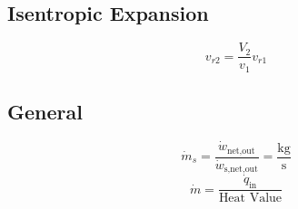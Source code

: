 \documentclass[10pt,landscape]{article}
\begin{document}
\begin{multicols}{3}
\subsection{Isentropic Expansion}
\begin{equation}
    v_{r2}=\frac{V_2}{v_1}v_{r1}
\end{equation}
\subsection{General}
\begin{equation}
    \dot{m}_s=\frac{\dot{w}_{\text{net,out}}}{\dot{w}_{\text{s,net,out}}}=\frac{\text{kg}}{\text{s}}
\end{equation}
\begin{equation}
    \dot{m}=\frac{\dot{q}_{\text{in}}}{\text{Heat Value}}    
\end{equation}


\end{multicols}
\end{document}
